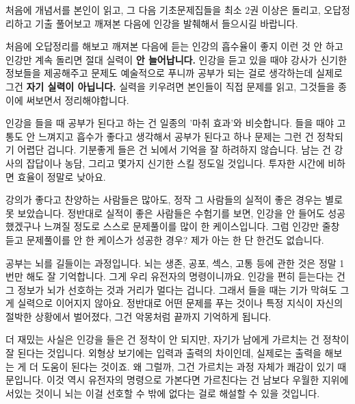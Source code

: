\vspace{5mm}

처음에 개념서를 본인이 읽고, 그 다음 기초문제집들을 최소 2권 이상은 돌리고, 오답정리하고
기출 풀어보고 깨져본 다음에 인강을 발췌해서 들으시길 바랍니다.
\vspace{5mm}

처음에 오답정리를 해보고 깨져본 다음에 듣는 인강의 흡수율이 좋지
이런 것 안 하고 인강만 계속 돌리면 절대 실력이 \textbf{안 늘어납니다.}
인강을 듣고 있을 때야 강사가 신기한 정보들을 제공해주고 문제도 예술적으로 푸니까 공부가 되는 걸로 생각하는데
실제로 그건 \textbf{자기 실력이 아닙니다.}
실력을 키우려면 본인들이 직접 문제를 읽고, 그것들을 종이에 써보면서 정리해야합니다.
\vspace{5mm}

인강을 들을 때 공부가 된다고 하는 건 일종의 '마취 효과'와 비슷합니다.
들을 때야 고통도 안 느껴지고 흡수가 좋다고 생각해서 공부가 된다고 하나
문제는 그런 건 정착되기 어렵단 겁니다. 기분좋게 들은 건 뇌에서 기억을 잘 하려하지 않습니다.
남는 건 강사의 잡답이나 농담, 그리고 몇가지 신기한 스킬 정도일 것입니다. 투자한 시간에 비하면 효율이 정말로 낮아요.
\vspace{5mm}

강의가 좋다고 찬양하는 사람들은 많아도, 정작 그 사람들의 실적이 좋은 경우는 별로 못 보았습니다.
정반대로 실적이 좋은 사람들은 수험기를 보면, 인강을 안 들어도 성공했겠구나 느껴질 정도로 스스로 문제풀이를 많이 한 케이스입니다.
그럼 인강만 줄창 듣고 문제풀이를 안 한 케이스가 성공한 경우? 제가 아는 한 단 한건도 없습니다.
\vspace{5mm}

공부는 뇌를 길들이는 과정입니다.
뇌는 생존, 공포, 섹스, 고통 등에 관한 것은 정말 1번만 해도 잘 기억합니다. 그게 우리 유전자의 명령이니까요.
인강을 편히 듣는다는 건 그 정보가 뇌가 선호하는 것과 거리가 멀다는 겁니다. 그래서 들을 때는 기가 막혀도 그게 실력으로 이어지지 않아요.
정반대로 어떤 문제를 푸는 것이나 특정 지식이 자신의 절박한 상황에서 벌어졌다, 그건 악몽처럼 끝까지 기억하게 됩니다.
\vspace{5mm}

더 재밌는 사실은 인강을 들은 건 정착이 안 되지만, 자기가 남에게 가르치는 건 정착이 잘 된다는 것입니다.
외형상 보기에는 입력과 출력의 차이인데, 실제로는 출력을 해보는 게 더 도움이 된다는 것이죠.
왜 그럴까, 그건 가르치는 과정 자체가 쾌감이 있기 때문입니다. 이것 역시 유전자의 명령으로 가본다면
가르친다는 건 남보다 우월한 지위에 서있는 것이니 뇌는 이걸 선호할 수 밖에 없다는 걸로 해설할 수 있을 것입니다.
\vspace{5mm}






